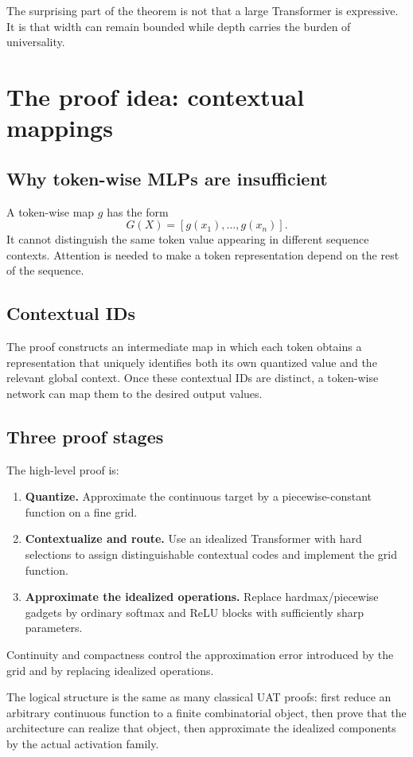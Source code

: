 \documentclass[11pt,a4paper,oneside,openany]{memoir}
\theoremstyle{definition}
\begin{document}
\begin{presentbox}
The surprising part of the theorem is not that a large Transformer is expressive.  It is that width can remain bounded while depth carries the burden of universality.
\end{presentbox}

\chapter{The proof idea: contextual mappings}
\section{Why token-wise MLPs are insufficient}
A token-wise map $g$ has the form
\[
G(X)=[g(x_1),\ldots,g(x_n)].
\]
It cannot distinguish the same token value appearing in different sequence contexts.  Attention is needed to make a token representation depend on the rest of the sequence.

\section{Contextual IDs}
The proof constructs an intermediate map in which each token obtains a representation that uniquely identifies both its own quantized value and the relevant global context.  Once these contextual IDs are distinct, a token-wise network can map them to the desired output values.

\section{Three proof stages}
The high-level proof is:
\begin{enumerate}
\item \textbf{Quantize.} Approximate the continuous target by a piecewise-constant function on a fine grid.
\item \textbf{Contextualize and route.} Use an idealized Transformer with hard selections to assign distinguishable contextual codes and implement the grid function.
\item \textbf{Approximate the idealized operations.} Replace hardmax/piecewise gadgets by ordinary softmax and ReLU blocks with sufficiently sharp parameters.
\end{enumerate}
Continuity and compactness control the approximation error introduced by the grid and by replacing idealized operations.

\begin{suppbox}
The logical structure is the same as many classical UAT proofs: first reduce an arbitrary continuous function to a finite combinatorial object, then prove that the architecture can realize that object, then approximate the idealized components by the actual activation family.
\end{suppbox}
\end{document}
